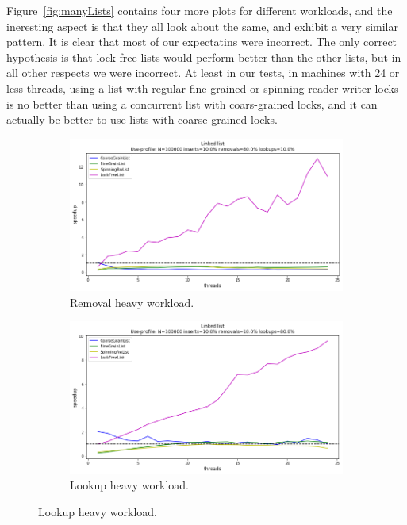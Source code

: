 \documentclass[11pt]{article}
\begin{document}
Figure~\ref{fig:manyLists} contains four more plots for different workloads, and
the ineresting aspect is that they all look about the same, and exhibit a very
similar pattern. It is clear that most of our expectatins were incorrect. The
only correct hypothesis is that lock free lists would perform better than the
other lists, but in all other respects we were incorrect. At least in our tests,
in machines with 24 or less threads, using a list with regular fine-grained or
spinning-reader-writer locks is no better than using a concurrent list with
coars-grained locks, and it can actually be better to use lists with
coarse-grained locks.

\begin{figure}[h]
\begin{subfigure}{.5\textwidth}
  \centering
  \includegraphics[width=.8\linewidth]{figs/lateday/combined/lateday_combined_list_insert_10_lookup_10_removal_80}
  \caption{Removal heavy workload.}
  \label{fig:listRemovalHeavy}
\end{subfigure}%
\hspace*{\fill}
\begin{subfigure}{.5\textwidth}
  \centering
  \includegraphics[width=.8\linewidth]{figs/lateday/combined/lateday_combined_list_insert_10_lookup_80_removal_10}
  \caption{Lookup heavy workload.}
  \label{fig:listLookupHeavy}
\end{subfigure}

\end{figure}
\end{document}
